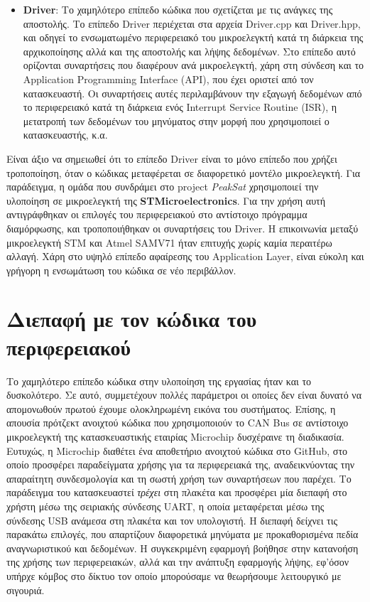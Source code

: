 \documentclass[a4paper,nobib,justified]{tufte-book}
\begin{document}
\begin{itemize}
	\item \textbf{Driver}: Το χαμηλότερο επίπεδο κώδικα που σχετίζεται με τις ανάγκες της αποστολής. Το επίπεδο Driver περιέχεται στα αρχεία Driver.cpp και Driver.hpp, και οδηγεί το ενσωματωμένο περιφερειακό του μικροελεγκτή κατά τη διάρκεια της αρχικοποίησης αλλά και της αποστολής και λήψης δεδομένων. Στο επίπεδο αυτό ορίζονται συναρτήσεις που διαφέρουν ανά μικροελεγκτή, χάρη στη σύνδεση και το Application Programming Interface (API), που έχει οριστεί από τον κατασκευαστή. Οι συναρτήσεις αυτές περιλαμβάνουν την εξαγωγή δεδομένων από το περιφερειακό κατά τη διάρκεια ενός Interrupt Service Routine (ISR), η μετατροπή των δεδομένων του μηνύματος στην μορφή που χρησιμοποιεί ο κατασκευαστής, κ.α.
\end{itemize}

Είναι άξιο να σημειωθεί ότι το επίπεδο Driver είναι το μόνο επίπεδο που χρήζει τροποποίηση, όταν ο κώδικας μεταφέρεται σε διαφορετικό μοντέλο μικροελεγκτή. Για παράδειγμα, η ομάδα που συνδράμει στο project \textit{PeakSat} χρησιμοποιεί την υλοποίηση σε μικροελεγκτή της \textbf{STMicroelectronics}. Για την χρήση αυτή αντιγράφθηκαν οι επιλογές του περιφερειακού στο αντίστοιχο πρόγραμμα διαμόρφωσης, και τροποποιήθηκαν οι συναρτήσεις του Driver. Η επικοινωνία μεταξύ μικροελεγκτή STM και Atmel SAMV71 ήταν επιτυχής χωρίς καμία περαιτέρω αλλαγή. Χάρη στο υψηλό επίπεδο αφαίρεσης του Application Layer, είναι εύκολη και γρήγορη η ενσωμάτωση του κώδικα σε νέο περιβάλλον.

\clearpage
\section{Διεπαφή με τον κώδικα του περιφερειακού}
Το χαμηλότερο επίπεδο κώδικα στην υλοποίηση της εργασίας ήταν και το δυσκολότερο. Σε αυτό, συμμετέχουν πολλές παράμετροι οι οποίες δεν είναι δυνατό να απομονωθούν πρωτού έχουμε ολοκληρωμένη εικόνα του συστήματος. Επίσης, η απουσία πρότζεκτ ανοιχτού κώδικα που χρησιμοποιούν το CAN Bus σε αντίστοιχο μικροελεγκτή της κατασκευαστικής εταιρίας Microchip δυσχέραινε τη διαδικασία. Ευτυχώς, η Microchip διαθέτει ένα αποθετήριο ανοιχτού κώδικα στο GitHub, στο οποίο προσφέρει παραδείγματα χρήσης για τα περιφερειακά της, αναδεικνύοντας την απαραίτητη συνδεσμολογία και τη σωστή χρήση των συναρτήσεων που παρέχει. Το παράδειγμα του κατασκευαστεί \textit{τρέχει} στη πλακέτα και προσφέρει μία διεπαφή στο χρήστη μέσω της σειριακής σύνδεσης UART, η οποία μεταφέρεται μέσω της σύνδεσης USB ανάμεσα στη πλακέτα και τον υπολογιστή. Η διεπαφή δείχνει τις παρακάτω επιλογές, που απαρτίζουν διαφορετικά μηνύματα με προκαθορισμένα πεδία αναγνωριστικού και δεδομένων. Η συγκεκριμένη εφαρμογή βοήθησε στην κατανοήση της χρήσης των περιφερειακών, αλλά και την ανάπτυξη εφαρμογής λήψης, εφ'όσον υπήρχε κόμβος στο δίκτυο τον οποίο μπορούσαμε να θεωρήσουμε λειτουργικό με σιγουριά.
\end{document}
